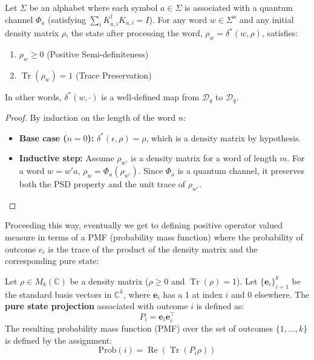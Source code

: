 \begin{theorem}
Let $\Sigma$ be an alphabet where each symbol $a \in \Sigma$ is associated with a quantum channel $\Phi_a$ (satisfying $\sum_i K_{a,i}^\dagger K_{a,i} = I$). For any word $w \in \Sigma^n$ and any initial density matrix $\rho$, the state after processing the word, $\rho_w = \delta^*(w, \rho)$, satisfies:
\begin{enumerate}
    \item $\rho_w \ge 0$ (Positive Semi-definiteness)
    \item $\operatorname{Tr}(\rho_w) = 1$ (Trace Preservation)
\end{enumerate}
In other words, $\delta^*(w, \cdot)$ is a well-defined map from $\mathcal{D}_q$ to $\mathcal{D}_q$.
\end{theorem}

\begin{proof}
By induction on the length of the word $n$:
\begin{itemize}
    \item \textbf{Base case ($n=0$):} $\delta^*(\epsilon, \rho) = \rho$, which is a density matrix by hypothesis.
    \item \textbf{Inductive step:} Assume $\rho_{w'}$ is a density matrix for a word of length $m$. For a word $w = w'a$, $\rho_w = \Phi_a(\rho_{w'})$. Since $\Phi_a$ is a quantum channel, it preserves both the PSD property and the unit trace of $\rho_{w'}$.
\end{itemize}
\end{proof}

Proceeding this way, eventually we get to defining positive operator valued measure in terms of a PMF (probability mass function) where the probability of outcome $e_i$ is the trace of the product of the density matrix and the corresponding pure state:

\begin{definition}
Let $\rho \in M_k(\mathbb{C})$ be a density matrix ($\rho \ge 0$ and $\operatorname{Tr}(\rho) = 1$). 
Let $\{\mathbf{e}_i\}_{i=1}^k$ be the standard basis vectors in $\mathbb{C}^k$, where $\mathbf{e}_i$ has a 1 at index $i$ and 0 elsewhere. 
The \textbf{pure state projection} associated with outcome $i$ is defined as:
\begin{equation}
    P_i = \mathbf{e}_i \mathbf{e}_i^\top
\end{equation}
The resulting probability mass function (PMF) over the set of outcomes $\{1, \dots, k\}$ is defined by the assignment:
\begin{equation}
    \text{Prob}(i) = \operatorname{Re}(\operatorname{Tr}(P_i \rho))
\end{equation}
\end{definition}

